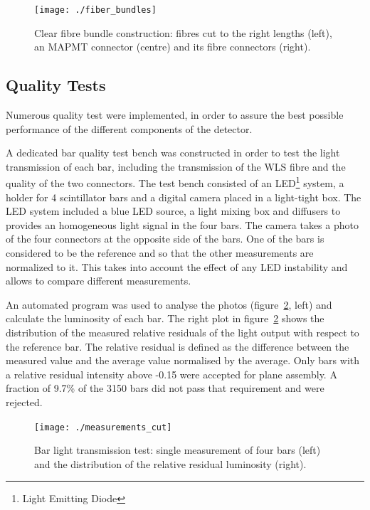 \documentclass[a4paper,11pt]{article}
\begin{document}
\begin{figure}[htp!]
 \centering
 \texttt{[image: ./fiber\_bundles]}
 \caption[Clear fibre bundles]{Clear fibre bundle construction: fibres cut to the right lengths (left), an MAPMT connector (centre) and its fibre connectors (right).}
 \label{fig:fibre_bundles}
\end{figure}

\subsection{Quality Tests}\label{construction:subsec:quality_tests}

Numerous quality test were implemented, in order to assure the best possible performance of the different components of the detector. 

A dedicated bar quality test bench was constructed in order to test the light transmission of each bar, including the transmission of the WLS fibre and the
quality of the two connectors. The test bench consisted of an LED\footnote{Light Emitting Diode} system, a holder for 4 scintillator bars and a digital camera placed in a light-tight box. 
The LED system included a blue LED source, a light mixing box and diffusers to provides an homogeneous light signal in the four bars. The camera takes a photo of the four connectors at the opposite side of the bars. One of the bars is considered to be the
reference and so that the other measurements are normalized to it. This takes into account the effect of any LED instability and allows to
compare different measurements. 

An automated program was used to analyse the photos (figure~\ref{fig:measurements}, left) and calculate the luminosity
of each bar. The right plot in figure~\ref{fig:measurements} shows the distribution of the measured relative residuals of the light output with respect to the reference bar. The relative
residual is defined as the difference between the measured value and the average value normalised by the average. Only bars with a relative residual
intensity above -0.15 were accepted for plane assembly. A fraction of 9.7\% of the 3150 bars did not pass that requirement and were rejected.

\begin{figure}[htb]
 \centering
 \texttt{[image: ./measurements\_cut]}
 \caption[Bar quality test measurements]{Bar light transmission test: single measurement of four bars (left) and the distribution of the relative residual luminosity (right).}
 \label{fig:measurements}
\end{figure}
\end{document}
